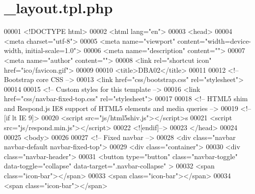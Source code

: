 \hypertarget{__layout_8tpl_8php}{\section{\-\_\-layout.\-tpl.\-php}
\label{__layout_8tpl_8php}
}

\begin{DoxyCode}
00001 <!DOCTYPE html>
00002 <html lang=\textcolor{stringliteral}{"en"}>
00003   <head>
00004     <meta charset=\textcolor{stringliteral}{"utf-8"}>
00005     <meta name=\textcolor{stringliteral}{"viewport"} content=\textcolor{stringliteral}{"width=device-width, initial-scale=1.0"}>
00006     <meta name=\textcolor{stringliteral}{"description"} content=\textcolor{stringliteral}{""}>
00007     <meta name=\textcolor{stringliteral}{"author"} content=\textcolor{stringliteral}{""}>
00008     <link rel=\textcolor{stringliteral}{"shortcut icon"} href=\textcolor{stringliteral}{"ico/favicon.gif"}>
00009 
00010     <title>DBA02</title>
00011 
00012     <!-- Bootstrap core CSS -->
00013     <link href=\textcolor{stringliteral}{"css/bootstrap.css"} rel=\textcolor{stringliteral}{"stylesheet"}>
00014 
00015     <!-- Custom styles \textcolor{keywordflow}{for} \textcolor{keyword}{this} \textcolor{keyword}{template} -->
00016     <link href=\textcolor{stringliteral}{"css/navbar-fixed-top.css"} rel=\textcolor{stringliteral}{"stylesheet"}>
00017 
00018     <!-- HTML5 shim and Respond.js IE8 support of HTML5 elements and media queries -->
00019     <!--[\textcolor{keywordflow}{if} lt IE 9]>
00020       <script src=\textcolor{stringliteral}{"js/html5shiv.js"}></script>s
00021       <script src=\textcolor{stringliteral}{"js/respond.min.js"}></script>
00022     <![endif]-->
00023   </head>
00024 
00025   <body>
00026 
00027     <!-- Fixed navbar -->
00028     <div \textcolor{keyword}{class}=\textcolor{stringliteral}{"navbar navbar-default navbar-fixed-top"}>
00029       <div \textcolor{keyword}{class}=\textcolor{stringliteral}{"container"}>
00030         <div \textcolor{keyword}{class}=\textcolor{stringliteral}{"navbar-header"}>
00031           <button type=\textcolor{stringliteral}{"button"} \textcolor{keyword}{class}=\textcolor{stringliteral}{"navbar-toggle"} data-toggle=\textcolor{stringliteral}{"collapse"} data-target=\textcolor{stringliteral}{".navbar-collapse"}
      >
00032             <span \textcolor{keyword}{class}=\textcolor{stringliteral}{"icon-bar"}></span>
00033             <span \textcolor{keyword}{class}=\textcolor{stringliteral}{"icon-bar"}></span>
00034             <span \textcolor{keyword}{class}=\textcolor{stringliteral}{"icon-bar"}></span>

\end{DoxyCode}
